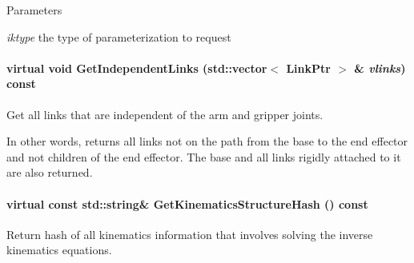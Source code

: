 \begin{DoxyParams}{Parameters}
\item[{\em iktype}]the type of parameterization to request \end{DoxyParams}
\hypertarget{classOpenRAVE_1_1RobotBase_1_1Manipulator_a9891f6fc2999ae047ebc9d06c0bf4069}{
\paragraph[{GetIndependentLinks}]{\setlength{\rightskip}{0pt plus 5cm}virtual void GetIndependentLinks (std::vector$<$ LinkPtr $>$ \& {\em vlinks}) const}\hfill}
\label{classOpenRAVE_1_1RobotBase_1_1Manipulator_a9891f6fc2999ae047ebc9d06c0bf4069}


Get all links that are independent of the arm and gripper joints. 

In other words, returns all links not on the path from the base to the end effector and not children of the end effector. The base and all links rigidly attached to it are also returned. \hypertarget{classOpenRAVE_1_1RobotBase_1_1Manipulator_a7322a77b768ce7997022a7b4b4ca46fe}{
\paragraph[{GetKinematicsStructureHash}]{\setlength{\rightskip}{0pt plus 5cm}virtual const std::string\& GetKinematicsStructureHash () const}\hfill}
\label{classOpenRAVE_1_1RobotBase_1_1Manipulator_a7322a77b768ce7997022a7b4b4ca46fe}


Return hash of all kinematics information that involves solving the inverse kinematics equations. 

